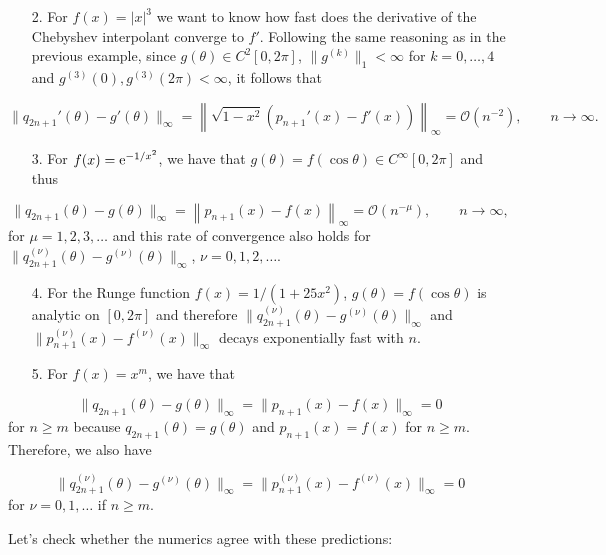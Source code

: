 \documentclass[12pt,a4paper]{article}
\begin{document}
\begin{itemize}
\item[2. ] For $f(x) = \vert x \vert^3$ we want to know how fast does the derivative of the Chebyshev interpolant converge to $f'$.  Following the same reasoning as in the previous example, since $g(\theta) \in C^{2}[0, 2\pi]$, $\| g^{(k)}\|_1 < \infty$ for $k = 0, \ldots, 4$ and $g^{(3)}(0), g^{(3)}(2\pi) < \infty$, it follows that

\end{itemize}
\[
\| q_{2n+1}'(\theta) - g'(\theta) \|_{\infty} = \left\|\sqrt{1-x^2}( p_{n+1}'(x) - f'(x)) \right\|_{\infty} = \mathcal{O}\left( n^{-2} \right), \qquad n \to \infty.
\]
\begin{itemize}
\item[3. ] For $f(x) = {\rm e}^{-1/x^2}$, we have that $g(\theta) = f(\cos\theta) \in C^{\infty}[0, 2\pi]$ and thus

\end{itemize}
\[
\| q_{2n+1}(\theta) - g(\theta) \|_{\infty} = \left\| p_{n+1}(x) - f(x) \right\|_{\infty} = \mathcal{O}\left( n^{-\mu} \right), \qquad n \to \infty, 
\]
for $\mu = 1, 2, 3, \ldots$ and this rate of convergence also holds for $\| q_{2n+1}^{(\nu)}(\theta) - g^{(\nu)}(\theta) \|_{\infty}$, $\nu = 0, 1, 2, \ldots$.

\begin{itemize}
\item[4. ] For the Runge function $f(x) = 1/(1 + 25x^2)$,  $g(\theta) = f(\cos\theta)$ is analytic on $[0, 2\pi]$ and therefore $\| q_{2n+1}^{(\nu)}(\theta) - g^{(\nu)}(\theta) \|_{\infty}$ and $\| p_{n+1}^{(\nu)}(x) - f^{(\nu)}(x) \|_{\infty}$ decays exponentially fast with $n$. 


\item[5. ] For $f(x) = x^{m}$, we have that

\end{itemize}
\[
\| q_{2n+1}(\theta) - g(\theta) \|_{\infty} = \| p_{n+1}(x) - f(x) \|_{\infty} = 0
\]
for $n \geq m$ because $q_{2n+1}(\theta) = g(\theta)$ and $p_{n+1}(x) = f(x)$ for $n \geq m$.  Therefore, we also have  

\[
\| q_{2n+1}^{(\nu)}(\theta) - g^{(\nu)}(\theta) \|_{\infty} = \| p_{n+1}^{(\nu)}(x) - f^{(\nu)}(x) \|_{\infty} = 0
\]
for $\nu = 0, 1, \ldots$ if $n \geq m$.

Let's check whether the numerics agree with these predictions:
\end{document}
